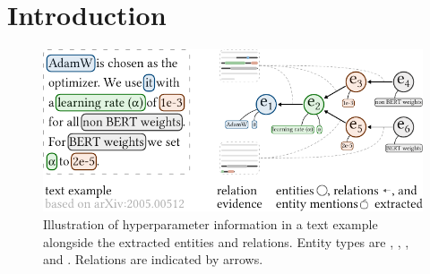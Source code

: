 
\section{Introduction}

\begin{figure}[bt]
  \centering
  \includegraphics[width=\linewidth]{figures/ref_params/schema_visual_v3}
  \caption[Illustration of hyperparameter information in a text example alongside the extracted entities and relations]{Illustration of hyperparameter information in a text example alongside the extracted entities and relations. Entity types are {\color{artifactblue}{research artifact}}, {\color{parametergreen}{parameter}}, {\color{valuered}{value}}, and {\color{contextgrey}{context}}. Relations are indicated by arrows.}
  \label{fig:schema-visual}
\end{figure}

